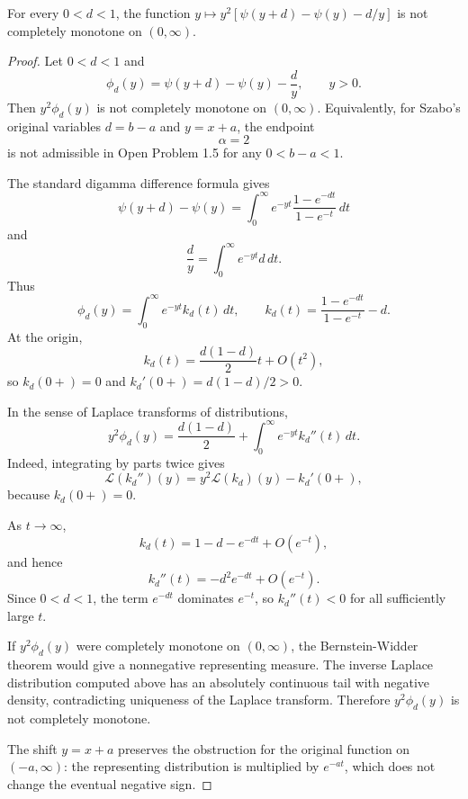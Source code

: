 \begin{counterexample}
\label{res:szabo-psi-difference-alpha2-not-cm}
For every \(0<d<1\), the function \(y\mapsto y^2\left[\psi(y+d)-\psi(y)-d/y\right]\) is not completely monotone on \((0,\infty)\).
\end{counterexample}
\begin{proof}
Let \(0<d<1\) and
\[
\phi_d(y)=\psi(y+d)-\psi(y)-\frac{d}{y},\qquad y>0.
\]
Then \(y^2\phi_d(y)\) is not completely monotone on \((0,\infty)\). Equivalently, for Szabo's original variables \(d=b-a\) and \(y=x+a\), the endpoint
\[
\alpha=2
\]
is not admissible in Open Problem 1.5 for any \(0<b-a<1\).

The standard digamma difference formula gives
\[
\psi(y+d)-\psi(y)=\int_0^\infty e^{-yt}\frac{1-e^{-dt}}{1-e^{-t}}\,dt
\]
and
\[
\frac{d}{y}=\int_0^\infty e^{-yt}d\,dt.
\]
Thus
\[
\phi_d(y)=\int_0^\infty e^{-yt}k_d(t)\,dt,\qquad
k_d(t)=\frac{1-e^{-dt}}{1-e^{-t}}-d.
\]
At the origin,
\[
k_d(t)=\frac{d(1-d)}2t+O(t^2),
\]
so \(k_d(0+)=0\) and \(k_d'(0+)=d(1-d)/2>0\).

In the sense of Laplace transforms of distributions,
\[
y^2\phi_d(y)
=\frac{d(1-d)}2+\int_0^\infty e^{-yt}k_d''(t)\,dt.
\]
Indeed, integrating by parts twice gives
\[
\mathcal L(k_d'')(y)=y^2\mathcal L(k_d)(y)-k_d'(0+),
\]
because \(k_d(0+)=0\).

As \(t\to\infty\),
\[
k_d(t)=1-d-e^{-dt}+O(e^{-t}),
\]
and hence
\[
k_d''(t)=-d^2e^{-dt}+O(e^{-t}).
\]
Since \(0<d<1\), the term \(e^{-dt}\) dominates \(e^{-t}\), so \(k_d''(t)<0\) for all sufficiently large \(t\).

If \(y^2\phi_d(y)\) were completely monotone on \((0,\infty)\), the Bernstein-Widder theorem would give a nonnegative representing measure. The inverse Laplace distribution computed above has an absolutely continuous tail with negative density, contradicting uniqueness of the Laplace transform. Therefore \(y^2\phi_d(y)\) is not completely monotone.

The shift \(y=x+a\) preserves the obstruction for the original function on \((-a,\infty)\): the representing distribution is multiplied by \(e^{-at}\), which does not change the eventual negative sign.
\end{proof}

